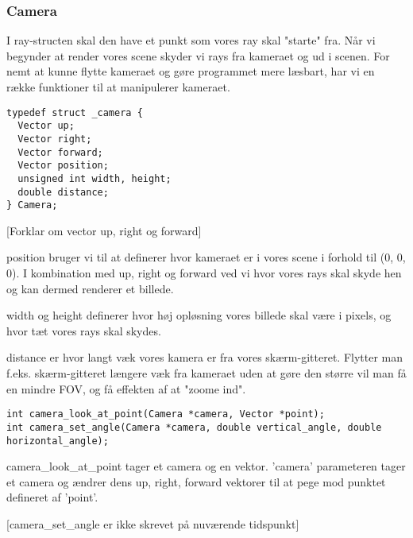 \subsubsection{Camera}
I ray-structen skal den have et punkt som vores ray skal "starte" fra. Når vi begynder at render vores scene skyder vi rays fra kameraet og ud i scenen. For nemt at kunne flytte kameraet og gøre programmet mere læsbart, har vi en række funktioner til at manipulerer kameraet.

\begin{lstlisting}[style=Cstyle, caption=Definition af Camera struct ]
typedef struct _camera {
  Vector up;
  Vector right;
  Vector forward;
  Vector position;
  unsigned int width, height;
  double distance;
} Camera;
\end{lstlisting}

[Forklar om vector up, right og forward]

position bruger vi til at definerer hvor kameraet er i vores scene i forhold til (0, 0, 0). I kombination med up, right og forward ved vi hvor vores rays skal skyde hen og kan dermed renderer et billede.

width og height definerer hvor høj opløsning vores billede skal være i pixels, og hvor tæt vores rays skal skydes.

distance er hvor langt væk vores kamera er fra vores skærm-gitteret. Flytter man f.eks. skærm-gitteret længere væk fra kameraet uden at gøre den større vil man få en mindre FOV\cite{fov}, og få effekten af at "zoome ind".

\begin{lstlisting}[style=Cstyle, caption=Prototyper for funktioner der manipulerer camera-structen ]
int camera_look_at_point(Camera *camera, Vector *point);
int camera_set_angle(Camera *camera, double vertical_angle, double horizontal_angle);
\end{lstlisting}

camera\_look\_at\_point tager et camera og en vektor. 'camera' parameteren tager et camera og ændrer dens up, right, forward vektorer til at pege mod punktet defineret af 'point'.

[camera\_set\_angle er ikke skrevet på nuværende tidspunkt]